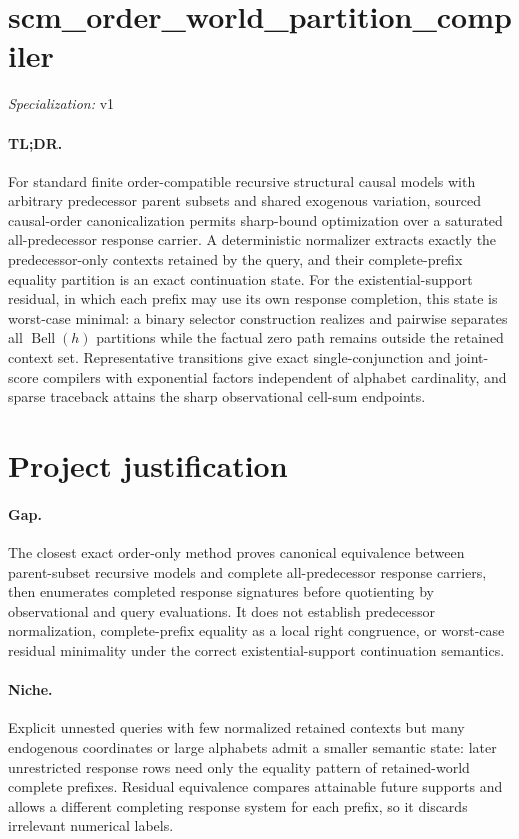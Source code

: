 \documentclass{article}
\begin{document}
\sloppy

\section*{scm\_\allowbreak{}order\_\allowbreak{}world\_\allowbreak{}partition\_\allowbreak{}compiler}

\noindent\textit{Specialization:} v1\par

\paragraph{TL;DR.} For standard finite order-compatible recursive structural causal models with arbitrary predecessor parent subsets and shared exogenous variation, sourced causal-order canonicalization permits sharp-bound optimization over a saturated all-predecessor response carrier. A deterministic normalizer extracts exactly the predecessor-only contexts retained by the query, and their complete-prefix equality partition is an exact continuation state. For the existential-support residual, in which each prefix may use its own response completion, this state is worst-case minimal: a binary selector construction realizes and pairwise separates all \(\operatorname{Bell}(h)\) partitions while the factual zero path remains outside the retained context set. Representative transitions give exact single-conjunction and joint-score compilers with exponential factors independent of alphabet cardinality, and sparse traceback attains the sharp observational cell-sum endpoints.

\section{Project justification}

\paragraph{Gap.} The closest exact order-only method proves canonical equivalence between parent-subset recursive models and complete all-predecessor response carriers, then enumerates completed response signatures before quotienting by observational and query evaluations. It does not establish predecessor normalization, complete-prefix equality as a local right congruence, or worst-case residual minimality under the correct existential-support continuation semantics.

\paragraph{Niche.} Explicit unnested queries with few normalized retained contexts but many endogenous coordinates or large alphabets admit a smaller semantic state: later unrestricted response rows need only the equality pattern of retained-world complete prefixes. Residual equivalence compares attainable future supports and allows a different completing response system for each prefix, so it discards irrelevant numerical labels.
\end{document}
